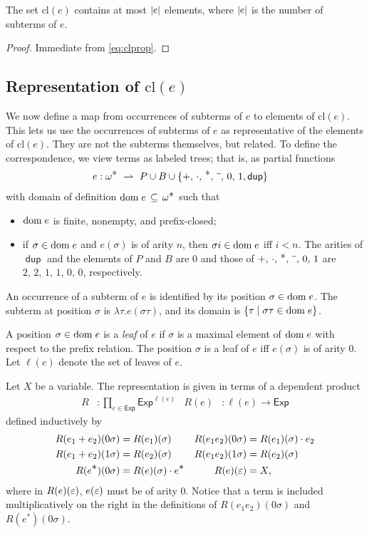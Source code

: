 \documentclass{article}
\newcommand\pdup{\mathop{\mathsf{dup}}}
\newcommand\Exp{\mathsf{Exp}}
\renewcommand\star{^{\textstyle *}}
\newcommand\clname{\mathrm{cl}}
\newcommand\cl[1]{\clname(#1)}
\begin{document}
\begin{lemma}
\label{eq:derivlinear}
The set $\cl e$ contains at most $|e|$ elements, where $|e|$ is the
number of subterms of $e$.
\end{lemma}
\begin{proof}
Immediate from \eqref{eq:clprop}.
\end{proof}

\subsection*{Representation of $\cl e$}

\newcommand\repname{R}
\newcommand\repone[1]{\repname(#1)}
\newcommand\rep[2]{\repname(#2)(#1)}
\newcommand\pfun\rightharpoonup

We now define a map from occurrences of subterms of $e$ to elements of $\cl e$. This lets us use the occurrences of subterms of $e$ as representative of the elements of $\cl e$. They are not the subterms themselves, but related. To define the correspondence, we view terms as labeled trees; that is, as partial functions
\begin{align*}
e:\omega\star\ &\pfun\ P\cup B\cup\{+,\,\cdot,\,\star,\,\barnone,\,0,\,1,\pdup\}
\end{align*}
with domain of definition $\dom e\subs\omega\star$ such that
\begin{itemize}
\item 
${\rm dom\;}e$ is finite, nonempty, and prefix-closed;
\item
if $\sigma\in{\rm dom\;}e$ and $e(\sigma)$ is of arity $n$, then $\sigma i\in{\rm dom\;}e$ iff $i < n$.  The arities of $\pdup$ and the elements of $P$ and $B$ are $0$ and those of $+,\,\cdot,\,\star,\,\barnone,\,0,\,1$ are $2,\,2,\,1,\,1,\,0,\,0$, respectively.
\end{itemize}
An occurrence of a subterm of $e$ is identified by its position $\sigma\in{\rm dom\;}e$.  The subterm at position $\sigma$ is $\lambda\tau.e(\sigma\tau)$, and its domain is $\{\tau \mid \sigma\tau\in{\rm dom\;}e\}$.

A position $\sigma\in{\rm dom\;}e$ is a \emph{leaf} of $e$ if $\sigma$ is a maximal element of ${\rm dom\;}e$ with respect to the prefix relation. The position $\sigma$ is a leaf of $e$ iff $e(\sigma)$ is of arity 0. Let $\ell(e)$ denote the set of leaves of $e$.

Let $X$ be a variable. The representation is given in terms of a dependent product
\begin{align*}
\repname &: \prod_{e\in\Exp}\Exp^{\ell(e)} & \repone e &: \ell(e)\to\Exp
\end{align*}
defined inductively by
\begin{align*}
\rep{0\sigma}{e_1+e_2} &= \rep\sigma{e_1} & \rep{0\sigma}{e_1e_2} &= \rep\sigma{e_1}\cdot e_2\\
\rep{1\sigma}{e_1+e_2} &= \rep\sigma{e_2} & \rep{1\sigma}{e_1e_2} &= \rep\sigma{e_2}\\
\rep{0\sigma}{e\star} &= \rep\sigma e\cdot e\star & \rep\eps e &= X,
\end{align*}
where in $\rep\eps e$, $e(\varepsilon)$ must be of arity 0.
Notice that a term is included multiplicatively on the right in the definitions of $\rep{0\sigma}{e_1e_2}$ and $\rep{0\sigma}{e\star}$.
\end{document}
